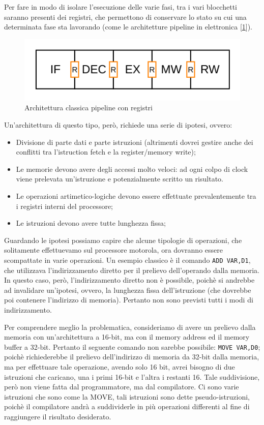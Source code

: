 Per fare in modo di isolare l'esecuzione delle varie fasi, tra i vari blocchetti saranno presenti dei registri, che permettono di conservare lo stato su cui una determinata fase sta lavorando (come le architetture pipeline in elettronica [\ref{img:pipe-reg}]). 

\begin{figure}
    \centering
    \includegraphics[width=.5\textwidth]{img/Pipe-reg.png}
    \caption{Architettura classica pipeline con registri}\label{img:pipe-reg}
\end{figure}

Un'architettura di questo tipo, però, richiede una serie di ipotesi, ovvero:
\begin{itemize}
    \item Divisione di parte dati e parte istruzioni (altrimenti dovrei gestire anche dei conflitti tra l'istruction fetch e la register/memory write);
    \item Le memorie devono avere degli accessi molto veloci: ad ogni colpo di clock viene prelevata un'istruzione e potenzialmente scritto un risultato.
    \item Le operazioni artimetico-logiche devono essere effettuate prevalentemente tra i registri interni del processore;
    \item Le istruzioni devono avere tutte lunghezza fissa;
\end{itemize}

Guardando le ipotesi possiamo capire che alcune tipologie di operazioni, che solitamente effettuevamo sul processore motorola, ora dovranno essere scompattate in varie operazioni. Un esempio classico è il comando \lstinline|ADD VAR,D1|, che utilizzava l'indirizzamento diretto per il prelievo dell'operando dalla memoria. In questo caso, però, l'indirizzamento diretto non è possibile, poichè si andrebbe ad invalidare un'ipotesi, ovvero, la lunghezza fissa dell'istruzione (che dovrebbe poi contenere l'indirizzo di memoria). Pertanto non sono previsti tutti i modi di indirizzamento.

Per comprendere meglio la problematica, consideriamo di avere un prelievo dalla memoria con un'architettura a 16-bit, ma con il memory address ed il memory buffer a 32-bit. Pertanto il seguente comando non sarebbe possibile: \lstinline|MOVE VAR,D0|; poichè richiederebbe il prelievo dell'indirizzo di memoria da 32-bit dalla memoria, ma per effettuare tale operazione, avendo solo 16 bit, avrei bisogno di due istruzioni che caricano, una i primi 16-bit e l'altra i restanti 16. Tale suddivisione, però non viene fatta dal programmatore, ma dal compilatore. Ci sono varie istruzioni che sono come la MOVE, tali istruzioni sono dette pseudo-istruzioni, poichè il compilatore andrà a suddividerle in più operazioni differenti al fine di raggiungere il risultato desiderato.

